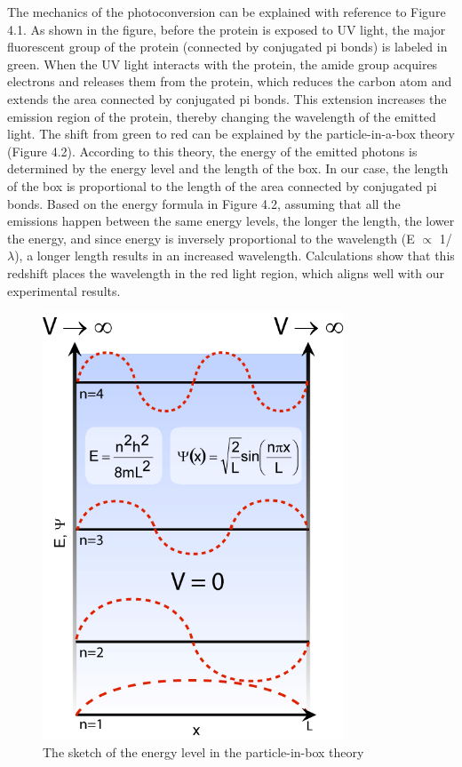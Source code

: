 \documentclass[a4paper,english,12pt,bibliography=totoc]{scrreprt}
\begin{document}
The mechanics of the photoconversion can be explained with reference to Figure 4.1. As shown in the figure, before the protein is exposed to UV light, the major fluorescent group of the protein (connected by conjugated pi bonds) is labeled in green. When the UV light interacts with the protein, the amide group acquires electrons and releases them from the protein, which reduces the carbon atom and extends the area connected by conjugated pi bonds. This extension increases the emission region of the protein, thereby changing the wavelength of the emitted light. The shift from green to red can be explained by the particle-in-a-box theory (Figure 4.2). According to this theory, the energy of the emitted photons is determined by the energy level and the length of the box. In our case, the length of the box is proportional to the length of the area connected by conjugated pi bonds. Based on the energy formula in Figure 4.2, assuming that all the emissions happen between the same energy levels, the longer the length, the lower the energy, and since energy is inversely proportional to the wavelength (E $\propto$ 1/$\lambda$), a longer length results in an increased wavelength. Calculations show that this redshift places the wavelength in the red light region, which aligns well with our experimental results.
\begin{figure}[H]
    \centering
    \includegraphics[width = 0.8\textwidth]{Figures/box_theory.png}
    \caption{The sketch of the energy level in the particle-in-box theory\cite{box}}
    \label{fig:enter-label}
\end{figure}
\end{document}
